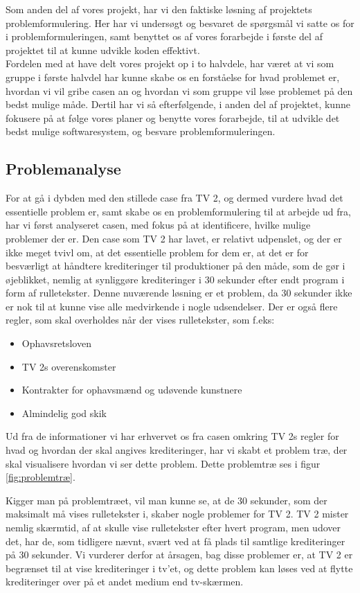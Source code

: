 Som anden del af vores projekt, har vi den faktiske løsning af projektets problemformulering. Her har vi undersøgt og besvaret de spørgsmål vi satte os for i problemformuleringen, samt benyttet os af vores forarbejde i første del af projektet til at kunne udvikle koden effektivt.\\
Fordelen med at have delt vores projekt op i to halvdele, har været at vi som gruppe i første halvdel har kunne skabe os en forståelse for hvad problemet er, hvordan vi vil gribe casen an og hvordan vi som gruppe vil løse problemet på den bedst mulige måde. Dertil har vi så efterfølgende, i anden del af projektet, kunne fokusere på at følge vores planer og benytte vores forarbejde, til at udvikle det bedst mulige softwaresystem, og besvare problemformuleringen.

\subsection{Problemanalyse}
For at gå i dybden med den stillede case fra TV 2, og dermed vurdere hvad det essentielle problem er, samt skabe os en problemformulering til at arbejde ud fra, har vi først analyseret casen, med fokus på at identificere, hvilke mulige problemer der er. Den case som TV 2 har lavet, er relativt udpenslet, og der er ikke meget tvivl om, at det essentielle problem for dem er, at det er for besværligt at håndtere krediteringer til produktioner på den måde, som de gør i øjeblikket, nemlig at synliggøre krediteringer i 30 sekunder efter endt program i form af rulletekster. Denne nuværende løsning er et problem, da 30 sekunder ikke er nok til at kunne vise alle medvirkende i nogle udsendelser. \cite{url_case} Der er også flere regler, som skal overholdes når der vises rulletekster, som f.eks:
\begin{itemize}
    \item Ophavsretsloven
    \item TV 2s overenskomster
    \item Kontrakter for ophavsmænd og udøvende kunstnere
    \item Almindelig god skik
\end{itemize}
Ud fra de informationer vi har erhvervet os fra casen omkring TV 2s regler for hvad og hvordan der skal angives krediteringer, har vi skabt et problem træ, der skal visualisere hvordan vi ser dette problem. Dette problemtræ ses i figur \ref{fig:problemtræ}. 

Kigger man på problemtræet, vil man kunne se, at de 30 sekunder, som der maksimalt må vises rulletekster i, skaber nogle problemer for TV 2. TV 2 mister nemlig skærmtid, af at skulle vise rulletekster efter hvert program, men udover det, har de, som tidligere nævnt, svært ved at få plads til samtlige krediteringer på 30 sekunder. Vi vurderer derfor at årsagen, bag disse problemer er, at TV 2 er begrænset til at vise krediteringer i tv'et, og dette problem kan løses ved at flytte krediteringer over på et andet medium end tv-skærmen. 

